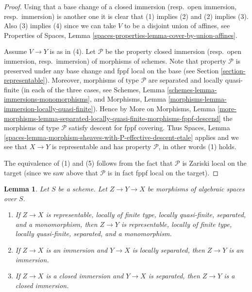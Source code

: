 \documentclass{stacks-project}
\theoremstyle{plain}
\newtheorem{lemma}[subsection]{Lemma}
\theoremstyle{definition}
\theoremstyle{remark}
\numberwithin{equation}{subsection}
\begin{document}
\begin{proof}
Using that a base change of a
closed immersion (resp.\ open immersion, resp.\ immersion)
is another one it is clear that (1) implies (2) and (2) implies (3).
Also (3) implies (4) since we can take $V$ to be a disjoint union of
affines, see
Properties of Spaces,
Lemma \ref{spaces-properties-lemma-cover-by-union-affines}.

\medskip\noindent
Assume $V \to Y$ is as in (4).
Let $\mathcal{P}$ be the property
closed immersion (resp.\ open immersion, resp.\ immersion)
of morphisms of schemes. Note that property $\mathcal{P}$
is preserved under any base change and fppf local on the
base (see Section \ref{section-representable}).
Moreover, morphisms of type $\mathcal{P}$ are separated and
locally quasi-finite (in each of the three cases, see
Schemes, Lemma \ref{schemes-lemma-immersions-monomorphisms}, and
Morphisms, Lemma \ref{morphisms-lemma-immersion-locally-quasi-finite}).
Hence by
More on Morphisms, Lemma
\ref{more-morphisms-lemma-separated-locally-quasi-finite-morphisms-fppf-descend}
the morphisms of type $\mathcal{P}$ satisfy descent for fppf covering. Thus
Spaces, Lemma \ref{spaces-lemma-morphism-sheaves-with-P-effective-descent-etale}
applies and we see that $X \to Y$ is representable and has property
$\mathcal{P}$, in other words (1) holds.

\medskip\noindent
The equivalence of (1) and (5) follows from the fact that
$\mathcal{P}$ is Zariski local on the target (since we saw
above that $\mathcal{P}$ is in fact fppf local on the target).
\end{proof}

\begin{lemma}
\label{lemma-immersion-permanence}
Let $S$ be a scheme.
Let $Z \to Y \to X$ be morphisms of algebraic spaces over $S$.
\begin{enumerate}
\item If $Z \to X$ is representable, locally of finite type, locally
quasi-finite, separated, and a monomorphism, then $Z \to Y$ is
representable, locally of finite type, locally quasi-finite,
separated, and a monomorphism.
\item If $Z \to X$ is an immersion and $Y \to X$ is locally separated,
then $Z \to Y$ is an immersion.
\item If $Z \to X$ is a closed immersion and $Y \to X$ is separated,
then $Z \to Y$ is a closed immersion.
\end{enumerate}
\end{lemma}
\end{document}
